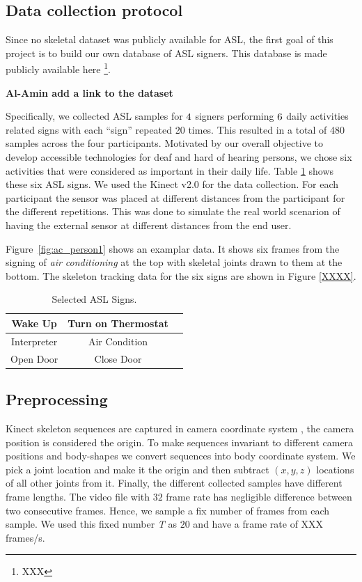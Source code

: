 \documentclass[10pt,twocolumn,letterpaper]{article}
\begin{document}
\subsection{Data collection protocol}

Since no skeletal dataset was publicly available for
ASL, the first goal of this project is to build our own 
database of ASL signers. This database is made publicly available here \footnote{XXX}.

{\bf Al-Amin add a link to the dataset}
%



Specifically, we collected  ASL samples 
for $\number4$ signers performing 
  $\number6$ daily activities related signs with each ``sign'' repeated 20 times. This resulted in a total of 480 samples 
  across the four participants. Motivated by our overall objective to develop
  accessible technologies for deaf and hard of hearing persons, we chose 
  six activities that were considered as important in their daily life. Table \ref{table:asl_signs} 
  shows these six ASL signs. We used the Kinect v2.0 for the data collection. For each participant 
the sensor was placed at different distances from the participant for the 
different repetitions. This was done to simulate the real world scenarion of having the external sensor 
at different distances from the end user. 

Figure~\ref{fig:ac_person1} shows an examplar data. It shows six frames from the signing of 
\textit{air conditioning} at the top with 
skeletal joints drawn  to them at the bottom.  The skeleton tracking data for the six signs 
are shown in Figure \ref{XXXX}.


\begin{table}[h]
	\begin{center}
		\begin{tabular}{|c|c|c}
			\hline
			Wake Up & Turn on Thermostat\\
			\hline
			Interpreter & Air Condition\\
			\hline
			Open Door & Close Door\\
			\hline
		\end{tabular}
	\end{center}
	\caption{Selected ASL Signs.}
	\label{table:asl_signs}
\end{table}

\subsection{Preprocessing}
Kinect skeleton sequences are 
captured in camera coordinate system \ie, the 
camera position is considered 
the origin. To make sequences invariant to different 
camera positions and body-shapes we convert sequences 
into body coordinate system. We pick a joint location 
and make it the 
origin and then  subtract $(x, y, z)$ locations of all
other joints from it. Finally, the 
different collected samples have
different frame lengths. The video file with $32$ frame rate has negligible difference between two consecutive frames. Hence, we sample 
a fix number of frames from each sample. We used this fixed number \textit{T} as  $20$ and have a frame rate of XXX frames/s. 
\end{document}
